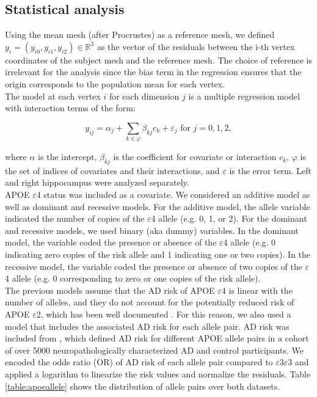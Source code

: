\subsection{Statistical analysis}
\label{subsec:stat}

Using the mean mesh (after Procrustes) as a reference mesh, we defined $y_i=(y_{i0}, y_{i1}, y_{i2}) \in \mathbb{R}^3$ as the vector of the residuals between the i-th vertex coordinates of the subject mesh and the reference mesh. The choice of reference is irrelevant for the analysis since the bias term in the regression ensures that the origin corresponds to the population mean for each vertex. \\

The model at each vertex $i$ for each dimension $j$ is a multiple regression model with interaction terms of the form:

\begin{equation}
    y_{ij} = \alpha_{j} + \sum_{k \in \mathcal{\varphi}} \beta_{kj} c_k + \varepsilon_j \textrm{ for } j = {0, 1, 2},
\end{equation} 

where $\alpha$ is the intercept, $\beta_{kj}$ is the coefficient for covariate or interaction $c_k$, $\mathcal{\varphi}$ is the set of indices of covariates and their interactions, and $\varepsilon$ is the error term. Left and right hippocampus were analyzed separately. \\ 

APOE $\varepsilon$4 status was included as a covariate. We considered an additive model as well as dominant and recessive models. For the additive model, the allele variable indicated the number of copies of the $\varepsilon$4 allele (e.g. 0, 1, or 2). For the dominant and recessive models, we used binary (aka dummy) variables. In the dominant model, the variable coded the presence or absence of the $\varepsilon$4 allele (e.g. 0 indicating zero copies of the risk allele and 1 indicating one or two copies). In the recessive model, the variable coded the presence or absence of two copies of the $\varepsilon$4 allele (e.g. 0 corresponding to zero or one copies of the risk allele). \\

The previous models assume that the AD risk of APOE $\varepsilon$4 is linear with the number of alleles, and they do not account for the potentially reduced risk of APOE $\varepsilon$2, which has been well documented \cite{Genin2011,Liu2013a}. For this reason, we also used a model that includes the associated AD risk for each allele pair. AD risk was included from \cite{Reiman2020}, which defined AD risk for different APOE allele pairs in a cohort of over 5000 neuropathologically characterized AD and control participants. We encoded the odds ratio (OR) of AD risk of each allele pair compared to $\varepsilon$3$\varepsilon$3 and applied a logarithm to linearize the risk values and normalize the residuals. Table \ref{table:apoeallele} shows the distribution of allele pairs over both datasets. \\

